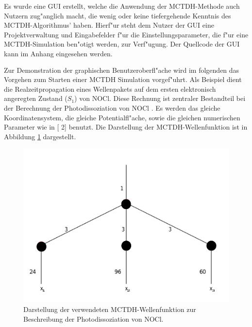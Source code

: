 Es wurde eine GUI erstellt, welche die Anwendung der MCTDH-Methode auch Nutzern zug"anglich macht, die wenig oder keine 
tiefergehende Kenntnis des MCTDH-Algorith\-mus' haben. Hierf"ur steht dem Nutzer der GUI eine Projektverwaltung und 
Eingabefelder f"ur die Einstellungsparameter, die f"ur eine MCTDH-Simulation ben"otigt werden, zur
Verf"ugung. 
Der Quellcode der GUI kann im Anhang eingesehen werden.

Zur Demonstration der graphischen Benutzeroberfl"ache wird im folgenden das Vorgehen zum Starten einer 
MCTDH Simulation vorgef"uhrt. Als Beispiel dient die Realzeitpro\-pagation eines Wellenpakets auf dem
ersten elektronisch angeregten Zustand ($S_1$) von NOCl. 
Diese Rechnung ist zentraler Bestandteil bei der Berechnung der Photodisso\-ziation von NOCl \cite{MMC1}.
Es werden das gleiche Koordinatensystem, die gleiche Potentialfl"ache, sowie die gleichen numerischen Parameter wie in
[{\color{darkblue} 2}] benutzt.
Die Darstellung der MCTDH-Wellenfunktion ist in Abbildung \ref{fig:NOCl} dargestellt. 

\begin{figure}
    \centering
    \includegraphics[scale=0.5]{figures/NOCl}
    \caption{Darstellung der verwendeten MCTDH-Wellenfunktion zur Beschreibung der Photodissoziation von NOCl.}\label{fig:NOCl}
\end{figure}

